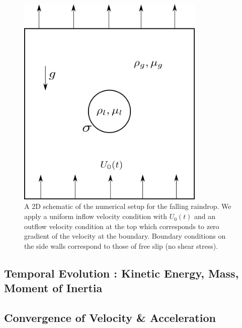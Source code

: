 \begin{figure}[h!]
\begin{center}
\includegraphics[width=0.8\textwidth]{plots/raindrop/setup.png}
\end{center}
\caption{A 2D schematic of the numerical setup for the falling raindrop. We apply a uniform inflow velocity condition with $U_0(t)$ and an outflow velocity condition at the top which corresponds to zero gradient of the velocity at the boundary. Boundary conditions on the side walls correspond to those of free slip (no shear stress).}
\label{setup}
\end{figure}


\subsection*{Temporal Evolution : Kinetic Energy, Mass, Moment of Inertia}
\blindtext

\subsection*{Convergence of Velocity \& Acceleration}
\blindtext


